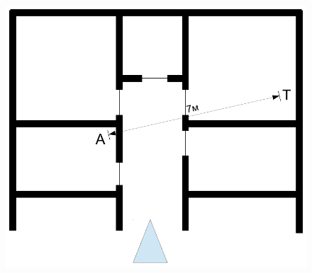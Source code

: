 \documentclass[a4paper,12pt,twoside,openright]{report}
\begin{document}
\begin{figure}[p]
\captionsetup[subfigure]{labelformat=empty}
  \centering
\begin{minipage}[c][6cm][t]{.39\textwidth}
  \vspace*{\fill}
  \centering
  \includegraphics[width=\textwidth]{demo_floorplan}
\end{minipage}\par\vfill
\begin{minipage}[c][9cm][t]{.39\textwidth}
  \vspace*{\fill}
  \centering

\end{minipage}
\end{figure}
\end{document}
